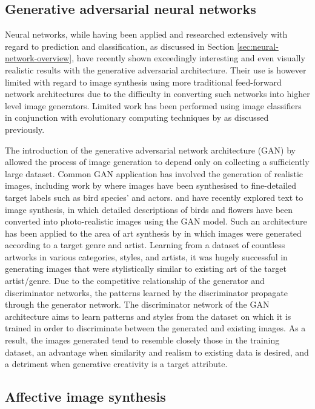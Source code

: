 \documentclass{article}
\begin{document}
\subsection{Generative adversarial neural networks}

Neural networks, while having been applied and researched extensively with regard to prediction and classification, as discussed in Section \ref{sec:neural-network-overview}, have recently shown exceedingly interesting and even visually realistic results with the generative adversarial architecture.
Their use is however limited with regard to image synthesis using more traditional feed-forward network architectures due to the difficulty in converting such networks into higher level image generators.
Limited work has been performed using image classifiers in conjunction with evolutionary computing techniques by \citet{nguyen2015innovation} as discussed previously.

The introduction of the generative adversarial network architecture (GAN) by \citet{GAN} allowed the process of image generation to depend only on collecting a sufficiently large dataset.
Common GAN application has involved the generation of realistic images, including work by \citet{bao2017cvae} where images have been synthesised to fine-detailed target labels such as bird species' and actors.
\citet{zhang2017stackgan} and \citet{reed2016generative} have recently explored text to image synthesis, in which detailed descriptions of birds and flowers have been converted into photo-realistic images using the GAN model.
Such an architecture has been applied to the area of art synthesis by \citet{tan2017artgan} in which images were generated according to a target genre and artist.
Learning from a dataset of countless artworks in various categories, styles, and artists, it was hugely successful in generating images that were stylistically similar to existing art of the target artist/genre.
Due to the competitive relationship of the generator and discriminator networks, the patterns learned by the discriminator propagate through the generator network.
The discriminator network of the GAN architecture aims to learn patterns and styles from the dataset on which it is trained in order to discriminate between the generated and existing images.
As a result, the images generated tend to resemble closely those in the training dataset, an advantage when similarity and realism to existing data is desired, and a detriment when generative creativity is a target attribute.


\subsection{Affective image synthesis}
\end{document}
